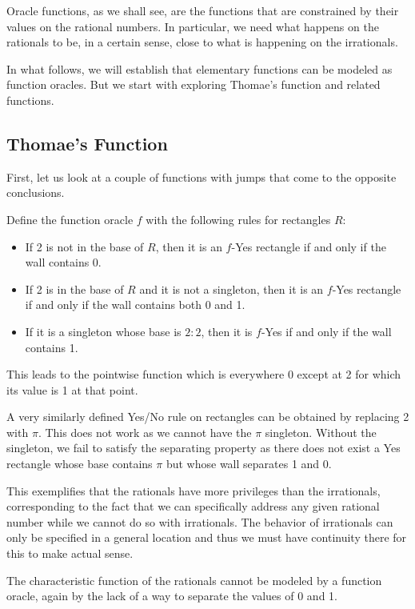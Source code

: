 \documentclass[12pt]{article}
\begin{document}
Oracle functions, as we shall see, are the functions that are constrained by their values on the rational numbers. In particular, we need what happens on the rationals to be, in a certain sense, close to what is happening on the irrationals. 

In what follows, we will establish that elementary functions can be modeled as function oracles. But we start with exploring Thomae's function and related functions.


\subsection{Thomae's Function}

First, let us look at a couple of functions with jumps that come to the opposite conclusions. 

Define the function oracle $f$ with the following rules for rectangles $R$: 

\begin{itemize}
    \item If 2 is not in the base of $R$, then it is an $f$-Yes rectangle if and only if the wall contains 0. 
    \item If 2 is in the base of $R$ and it is not a singleton, then it is an $f$-Yes rectangle if and only if the wall contains both 0 and 1.
    \item If it is a singleton whose base is $2:2$, then it is $f$-Yes if and only if the wall contains 1. 
\end{itemize}

This leads to the pointwise function which is everywhere 0 except at 2 for which its value is 1 at that point. 

A very similarly defined Yes/No rule on rectangles can be obtained by replacing 2 with $\pi$. This does not work as we cannot have the $\pi$ singleton. Without the singleton, we fail to satisfy the separating property as there does not exist a Yes rectangle whose base contains $\pi$ but whose wall separates 1 and 0.  

This exemplifies that the rationals have more privileges than the irrationals, corresponding to the fact that we can specifically address any given rational number while we cannot do so with irrationals. The behavior of irrationals can only be specified in a general location and thus we must have continuity there for this to make actual sense. 

The characteristic function of the rationals cannot be modeled by a function oracle, again by the lack of a way to separate the values of 0 and 1. 
\end{document}
